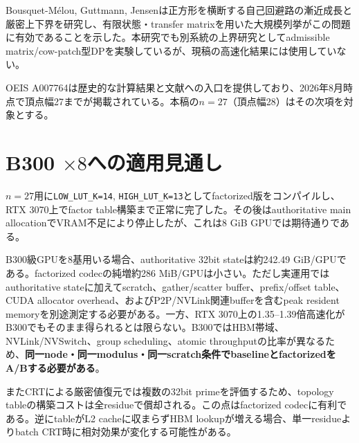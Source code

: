 \documentclass[a4paper,10pt,twocolumn]{ltjsarticle}
\newcommand{\code}[1]{\texttt{#1}}
\begin{document}
Bousquet-M\'elou, Guttmann, Jensenは正方形を横断する自己回避路の漸近成長と厳密上下界を研究し\cite{bmgj2005}、有限状態・transfer matrixを用いた大規模列挙がこの問題に有効であることを示した。本研究でも別系統の上界研究としてadmissible matrix/cow-patch型DPを実験しているが、現稿の高速化結果には使用していない。

OEIS A007764は歴史的な計算結果と文献への入口を提供しており、2026年8月時点で頂点幅27までが掲載されている\cite{oeis}。本稿の$n=27$（頂点幅28）はその次項を対象とする。

\section{B300 $\times8$への適用見通し}
$n=27$用に\code{LOW\_LUT\_K=14}, \code{HIGH\_LUT\_K=13}としてfactorized版をコンパイルし、RTX 3070上でfactor table構築まで正常に完了した。その後はauthoritative main allocationでVRAM不足により停止したが、これは8 GiB GPUでは期待通りである。

B300級GPUを8基用いる場合、authoritative 32bit stateは約242.49 GiB/GPUである。factorized codecの純増約286 MiB/GPUは小さい。ただし実運用ではauthoritative stateに加えてscratch、gather/scatter buffer、prefix/offset table、CUDA allocator overhead、およびP2P/NVLink関連bufferを含むpeak resident memoryを別途測定する必要がある。一方、RTX 3070上の1.35--1.39倍高速化がB300でもそのまま得られるとは限らない。B300ではHBM帯域、NVLink/NVSwitch、group scheduling、atomic throughputの比率が異なるため、\textbf{同一node・同一modulus・同一scratch条件でbaselineとfactorizedをA/Bする必要がある}。

またCRTによる厳密値復元では複数の32bit primeを評価するため、topology tableの構築コストは全residueで償却される。この点はfactorized codecに有利である。逆にtableがL2 cacheに収まらずHBM lookupが増える場合、単一residueよりbatch CRT時に相対効果が変化する可能性がある。
\end{document}
